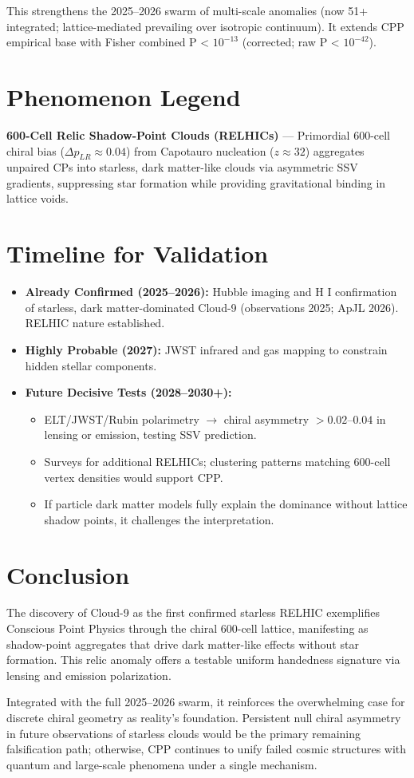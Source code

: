 \documentclass[11pt]{article}
\begin{document}
This strengthens the 2025--2026 swarm of multi-scale anomalies (now 51+ integrated; lattice-mediated prevailing over isotropic continuum). It extends CPP empirical base with Fisher combined P < $10^{-13}$ (corrected; raw P < $10^{-42}$).

\section{Phenomenon Legend}
\textbf{600-Cell Relic Shadow-Point Clouds (RELHICs)} — Primordial 600-cell chiral bias ($\Delta p_{LR} \approx 0.04$) from Capotauro nucleation ($z \approx 32$) aggregates unpaired CPs into starless, dark matter-like clouds via asymmetric SSV gradients, suppressing star formation while providing gravitational binding in lattice voids.

\section{Timeline for Validation}
\begin{itemize}
    \item \textbf{Already Confirmed (2025--2026):} Hubble imaging and H I confirmation of starless, dark matter-dominated Cloud-9 (observations 2025; ApJL 2026). RELHIC nature established.
    \item \textbf{Highly Probable (2027):} JWST infrared and gas mapping to constrain hidden stellar components.
    \item \textbf{Future Decisive Tests (2028--2030+):}
    \begin{itemize}
        \item ELT/JWST/Rubin polarimetry $\to$ chiral asymmetry $>0.02$--$0.04$ in lensing or emission, testing SSV prediction.
        \item Surveys for additional RELHICs; clustering patterns matching 600-cell vertex densities would support CPP.
        \item If particle dark matter models fully explain the dominance without lattice shadow points, it challenges the interpretation.
    \end{itemize}
\end{itemize}

\section{Conclusion}
The discovery of Cloud-9 as the first confirmed starless RELHIC exemplifies Conscious Point Physics through the chiral 600-cell lattice, manifesting as shadow-point aggregates that drive dark matter-like effects without star formation. This relic anomaly offers a testable uniform handedness signature via lensing and emission polarization.  

Integrated with the full 2025--2026 swarm, it reinforces the overwhelming case for discrete chiral geometry as reality's foundation. Persistent null chiral asymmetry in future observations of starless clouds would be the primary remaining falsification path; otherwise, CPP continues to unify failed cosmic structures with quantum and large-scale phenomena under a single mechanism.
\end{document}
